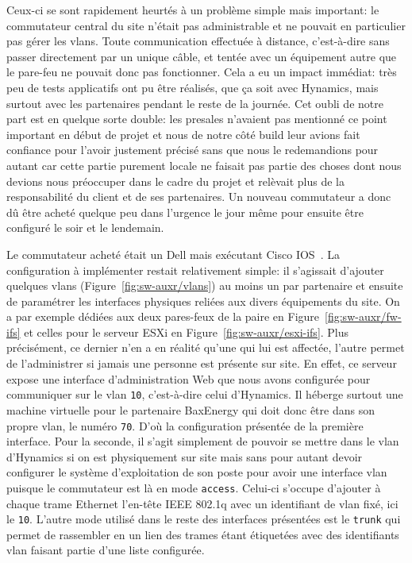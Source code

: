 \documentclass[12pt, oneside, a4paper, titlepage]{report}
\begin{document}
Ceux-ci se sont rapidement heurtés à un problème simple mais important: le
commutateur central du site n'était pas administrable et ne pouvait en
particulier pas gérer les \glspl{vlan}. Toute communication effectuée à
distance, c'est-à-dire sans passer directement par un unique câble, et tentée
avec un équipement autre que le pare-feu ne pouvait donc pas fonctionner. Cela a
eu un impact immédiat: très peu de tests applicatifs ont pu être réalisés, que
ça soit avec Hynamics, mais surtout avec les partenaires pendant le reste de la
journée. Cet oubli de notre part est en quelque sorte double: les \gls{presales}
n'avaient pas mentionné ce point important en début de projet et nous de notre
côté \gls{build} leur avions fait confiance pour l'avoir justement précisé sans
que nous le redemandions pour autant car cette partie purement locale ne faisait
pas partie des choses dont nous devions nous préoccuper dans le cadre du projet
et relèvait plus de la responsabilité du client et de ses partenaires.  Un
nouveau commutateur a donc dû être acheté quelque peu dans l'urgence le jour
même pour ensuite être configuré le soir et le lendemain.

Le commutateur acheté était un Dell mais exécutant Cisco IOS~\cite{cisco-ios}.
La configuration à implémenter restait relativement simple: il s'agissait
d'ajouter quelques \glspl{vlan} (Figure~\ref{fig:sw-auxr/vlans}) au moins un par
partenaire et ensuite de paramétrer les interfaces physiques reliées aux divers
équipements du site. On a par exemple dédiées aux deux pares-feux de la paire en
Figure~\ref{fig:sw-auxr/fw-ifs} et celles pour le serveur ESXi en
Figure~\ref{fig:sw-auxr/esxi-ifs}. Plus précisément, ce dernier n'en a en
réalité qu'une qui lui est affectée, l'autre permet de l'administrer si jamais
une personne est présente sur site. En effet, ce serveur expose une interface
d'administration Web que nous avons configurée pour communiquer sur le
\gls{vlan} \texttt{10}, c'est-à-dire celui d'Hynamics. Il héberge surtout une
machine virtuelle pour le partenaire BaxEnergy qui doit donc être dans son
propre \gls{vlan}, le numéro \texttt{70}. D'où la configuration présentée de la
première interface. Pour la seconde, il s'agit simplement de pouvoir se mettre
dans le \gls{vlan} d'Hynamics si on est physiquement sur site mais sans pour
autant devoir configurer le système d'exploitation de son poste pour avoir une
interface \gls{vlan} puisque le commutateur est là en mode \texttt{access}.
Celui-ci s'occupe d'ajouter à chaque trame Ethernet l'en-tête IEEE 802.1q avec
un identifiant de \gls{vlan} fixé, ici le \texttt{10}. L'autre mode utilisé dans
le reste des interfaces présentées est le \texttt{trunk} qui permet de
rassembler en un lien des trames étant étiquetées avec des identifiants
\gls{vlan} faisant partie d'une liste configurée.
\end{document}
